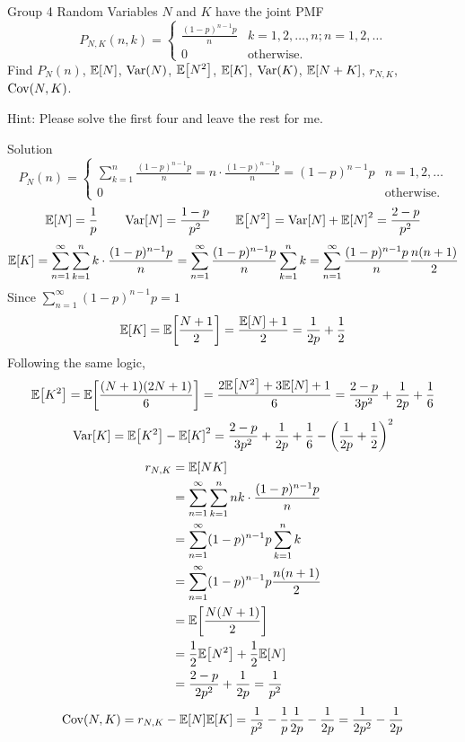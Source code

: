 \documentclass{article}
\begin{document}
\begin{problem}
    {Group 4}
    Random Variables $N$ and $K$ have the joint PMF
    \[
    P_{N,K}(n,k)={
        \begin{cases}
            \frac{(1-p)^{n-1}p}{n} & k=1,2,\ldots,n; n=1,2,\ldots\\
            0 & \text{otherwise.}
        \end{cases}
    }
    \]
    Find $P_N(n)$, $\E{N}$, $\mathop{\mathrm{Var}}\nolimits(N)$, $\E{N^2}$, $\E{K}$, $\mathop{\mathrm{Var}}\nolimits(K)$, $\E{N+K}$, $r_{N,K}$, $\mathop{\mathrm{Cov}}\nolimits(N,K)$.
    \begin{solution}
        {Hint:}
        Please solve the first four and leave the rest for me.
    \end{solution}
\end{problem}

\begin{solution}
    {Solution}
    \[
    P_N(n)={
        \begin{cases}
            \sum_{k=1}^{n}\frac{(1-p)^{n-1}p}{n}=n\cdot\frac{(1-p)^{n-1}p}{n}=(1-p)^{n-1}p & n=1,2,\ldots\\
            0 & \text{otherwise.}
        \end{cases}
    }
    \]
    \[
    \E{N} = \frac{1}{p} \qquad \Var[N] = \frac{1-p}{p^2} \qquad \E{N^2} = \Var[N] + \E{N}^2 = \frac{2-p}{p^2}
    \]
    \[
    \E{K} = \sum_{n=1}^{\infty}\sum_{k=1}^{n}k\cdot\frac{(1-p)^{n-1}p}{n} = \sum_{n=1}^{\infty}\frac{(1-p)^{n-1}p}{n}\sum_{k=1}^{n}k = \sum_{n=1}^{\infty}\frac{(1-p)^{n-1}p}{n}\frac{n(n+1)}{2}
    \]
    Since $\sum_{n=1}^{\infty}(1-p)^{n-1}p=1$
    \[
        \E{K} = \E{\frac{N+1}{2}} = \frac{\E{N}+1}{2} = \frac{1}{2p}+\frac{1}{2}
    \]
    Following the same logic,
    \[
    \E{K^2} = \E{\frac{(N+1)(2N+1)}{6}}=\frac{2\E{N^2}+3\E{N}+1}{6}= \frac{2-p}{3p^2}+\frac{1}{2p}+\frac{1}{6}
    \]
    \[
    \Var[K] = \E{K^2}-\E{K}^2 = \frac{2-p}{3p^2}+\frac{1}{2p}+\frac{1}{6}-\left(\frac{1}{2p}+\frac{1}{2}\right)^2
    \]
    \begin{align*}
        r_{N,K}
        &= \E{NK} \\
        &= \sum_{n=1}^{\infty}\sum_{k=1}^{n}nk\cdot\frac{(1-p)^{n-1}p}{n} \\
        &= \sum_{n=1}^{\infty}(1-p)^{n-1}p\sum_{k=1}^{n}k \\
        &= \sum_{n=1}^{\infty}(1-p)^{n-1}p\frac{n(n+1)}{2} \\
        &= \E{\frac{N(N+1)}{2}} \\
        &= \frac{1}{2}\E{N^2}+\frac{1}{2}\E{N} \\
        &= \frac{2-p}{2p^2}+\frac{1}{2p} = \frac{1}{p^2}
    \end{align*}
    \[
    \Cov(N,K) = r_{N,K}-\E{N}\E{K} = \frac{1}{p^2}-\frac{1}{p}\frac{1}{2p}-\frac{1}{2p} = \frac{1}{2p^2}-\frac{1}{2p}    
    \]
\end{solution}
\end{document}
